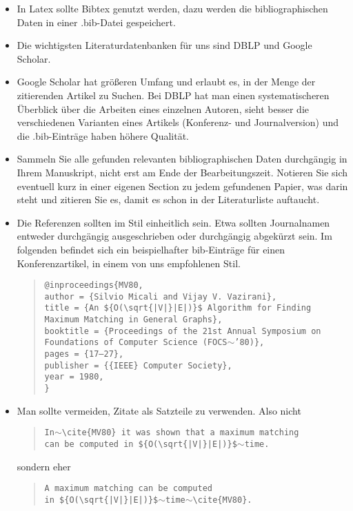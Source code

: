 \documentclass[12pt,a4paper]{article}
\begin{document}
\begin{itemize}
\item In Latex sollte Bibtex genutzt werden, dazu werden die bibliographischen Daten in
  einer .bib-Datei gespeichert.
\item Die wichtigsten Literaturdatenbanken für uns sind DBLP und Google Scholar.
\item Google Scholar hat größeren Umfang und erlaubt es, in der Menge der zitierenden
  Artikel zu Suchen. Bei DBLP hat man einen systematischeren Überblick über die Arbeiten eines einzelnen Autoren, sieht besser die verschiedenen Varianten eines Artikels (Konferenz- und Journalversion) und die .bib-Einträge haben höhere Qualität.
\item Sammeln Sie alle gefunden relevanten bibliographischen Daten durchgängig in Ihrem
  Manuskript, nicht erst am Ende der Bearbeitungszeit. Notieren Sie sich eventuell kurz in
  einer eigenen Section zu jedem gefundenen Papier, was darin steht und zitieren Sie es,
  damit es schon in der Literaturliste auftaucht.
\item Die Referenzen sollten im Stil einheitlich sein. Etwa sollten Journalnamen entweder durchgängig ausgeschrieben oder durchgängig abgekürzt sein. Im folgenden befindet sich ein beispielhafter bib-Einträge für einen Konferenzartikel, in einem von uns empfohlenen Stil.
  \begin{quote}
    \texttt{@inproceedings\{MV80,\\
  \quad author    = \{Silvio Micali and
               Vijay V. Vazirani\},\\
  \quad title     = \{An \$\{O(\textbackslash{}sqrt\{|V|\}|E|)\}\$ Algorithm
               for Finding Maximum Matching in General Graphs\},\\
  \quad booktitle = \{Proceedings of the 21st Annual Symposium on Foundations of Computer Science (FOCS$\sim$'80)\},\\
  \quad pages     = \{17--27\},\\
  \quad publisher = \{\{IEEE\} Computer Society\},\\
  year      = 1980,\\
  \}
}
  \end{quote}
\item Man sollte vermeiden, Zitate als Satzteile zu verwenden. Also nicht
  \begin{quote}
    \texttt{In$\sim$\textbackslash{}cite\{MV80\} it was shown that a maximum matching\\ can be computed
    in \$\{O(\textbackslash{}sqrt\{|V|\}|E|)\}\$$\sim$time.}
  \end{quote}
  sondern eher
  \begin{quote}
    \texttt{A maximum matching can be computed\\
    in \$\{O(\textbackslash{}sqrt\{|V|\}|E|)\}\$$\sim$time$\sim$\textbackslash{}cite\{MV80\}.}
  \end{quote}  
\end{itemize}
\end{document}
